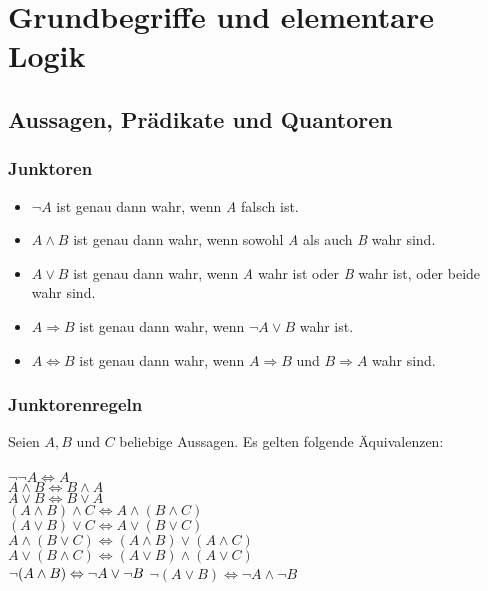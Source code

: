 \section{Grundbegriffe und elementare Logik}

\subsection{Aussagen, Prädikate und Quantoren}
\subsubsection{Junktoren}%
\label{ssub:Junktoren}
\begin{minipage}{0.9\linewidth}
\begin{itemize}
\item $\neg A$ ist genau dann wahr, wenn \textit{A} falsch ist.
\item $A  \land B$ ist genau dann wahr, wenn sowohl 
\textit{A} als auch \textit{B} wahr sind.
\item $A \lor B$ ist genau dann wahr, wenn \textit{A} wahr ist oder \textit{B} wahr ist, oder beide wahr sind.
\item $A \Rightarrow B$ ist genau dann wahr, wenn $\neg A \lor B$ wahr ist.
\item $A \Leftrightarrow B$ ist genau dann wahr, wenn $A \Rightarrow B$ und $B \Rightarrow A$ wahr sind.
\end{itemize}
\end{minipage}

\subsubsection{Junktorenregeln}
\begin{minipage}{0.9\linewidth}
Seien $A,B$ und $C$ beliebige Aussagen. Es gelten folgende Äquivalenzen: \\
\\
$\neg\neg A\Leftrightarrow A$\\
$A\wedge B\Leftrightarrow B\wedge A$\\
$A\vee B\Leftrightarrow B\vee A$\\
$(A\wedge B)\wedge C\Leftrightarrow A\wedge (B\wedge C)$ \\
$(A\vee B)\vee C\Leftrightarrow A\vee (B\vee C)$\\
$A\wedge (B\vee C)\Leftrightarrow (A\wedge B)\vee (A\wedge C)$ \\
$A\vee (B\wedge C)\Leftrightarrow (A\vee B)\wedge (A\vee C)$\\
$\neg(A\wedge B)\Leftrightarrow\neg A\vee\neg B\\$
$\neg(A\vee B)\Leftrightarrow \neg A\wedge\neg B$\\
\end{minipage}


